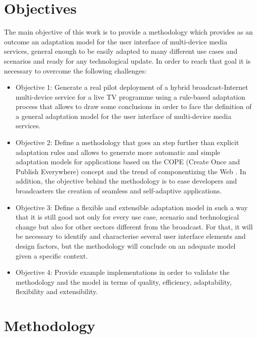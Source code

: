 \section{Objectives}\label{objectives}
The main objective of this work is to provide a methodology which provides as an outcome an adaptation model for the user interface of multi-device media services, general enough to be easily adapted to many different use cases and scenarios and ready for any technological update. In order to reach that goal it is necessary to overcome the following challenges:

\begin{itemize}
	\item Objective 1: Generate a real pilot deployment of a hybrid broadcast-Internet multi-device service for a live TV programme using a rule-based adaptation process that allows to draw some conclusions in order to face the definition of a general adaptation model for the user interface of multi-device media services. \label{objective:1}	
	\item Objective 2: Define a methodology that goes an step further than explicit adaptation rules and allows to generate more automatic and simple adaptation models for applications based on the COPE (Create Once and Publish Everywhere) \cite{nem} concept and the trend of componentizing the Web \cite{savage2015componentizing}. In addition, the objective behind the methodology is to ease developers and broadcasters the creation of seamless and self-adaptive applications.\label{objective:2}	 
	\item Objective 3: Define a flexible and extensible adaptation model in such a way that it is still good not only for every use case, scenario and technological change but also for other sectors different from the broadcast. For that, it will be necessary to identify and characterise several user interface elements and design factors, but the methodology will conclude on an adequate model given a specific context.\label{objective:3}	
	\item Objective 4: Provide example implementations in order to validate the methodology and the model in terms of quality, efficiency, adaptability, flexibility and extensibility.\label{objective:4}	
	
\end{itemize}  
\section{Methodology}\label{methodology}

